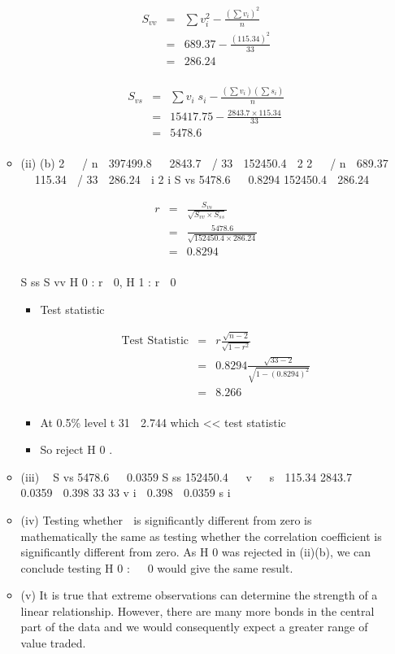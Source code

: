 \documentclass[a4paper,12pt]{article}
\begin{document}
\begin{enumerate}
\begin{itemize}
\begin{eqnarray*}
S_{vv} &=& \sum v_i^2 - \frac{(\sum v_i)^2 }{n} \\&=& 689.37 - \frac{(115.34 )^2}{33} \\
&=& 286.24 \\
\end{eqnarray*}



\begin{eqnarray*}
S_{vs} &=& \sum v_i\;s_i - \frac{(\sum v_i)(\sum s_i) }{n} \\
&=& 15417.75 - \frac{2843.7 \times  115.34 }{33} \\
&=& 5478.6\\
\end{eqnarray*}

\item (ii)
(b)
2 
 / n  397499.8   2843.7  / 33  152450.4

2
2 
 / n  689.37   115.34  / 33  286.24

i
2
i
S vs
5478.6

 0.8294
152450.4  286.24

\begin{eqnarray*}
r &=&  \frac{S_{vs}}{\sqrt{S_{vv} \times S_{ss} } }\\
&=& \frac{5478.6}{\sqrt{152450.4 \times 286.24 }}\\
&=& 0.8294\\
\end{eqnarray*}

S ss S vv
H 0 : r  0, H 1 : r  0

\begin{itemize}
    \item Test statistic 
    
\begin{eqnarray*} 
\mbox{Test Statistic} &=& r \frac{ \sqrt{n-2} }{\sqrt{1-r^2}} \\
&=& 0.8294 \frac{ \sqrt{33-2} }{\sqrt{1-(0.8294)^2}} \\
&=& 8.266 \\
\end{eqnarray*}

\item At 0.5\% level t 31  2.744 which << test statistic
\item So reject H 0 .
\end{itemize}
\item (iii)

S vs
5478.6

 0.0359
S ss 152450.4
  v   s 
115.34
2843.7
 0.0359
 0.398
33
33
v i  0.398  0.0359 s i

\item (iv)
Testing whether  is significantly different from zero is mathematically the same as testing whether the correlation coefficient is significantly different from zero.
As H 0 was rejected in (ii)(b), we can conclude testing H 0 :   0 would give
the same result.
\item 
(v)
It is true that extreme observations can determine the strength of a linear relationship. However, there are many more bonds in the central part of the data and we would consequently expect a greater range of value traded.


\end{itemize}
\end{enumerate}
\end{document}
